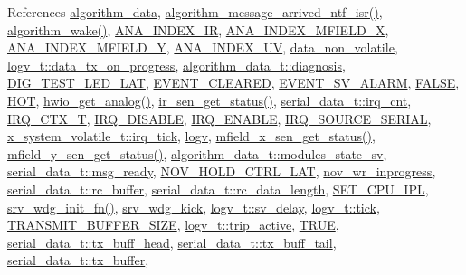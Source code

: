 References \hyperlink{a00038_source_l00033}{algorithm\+\_\+data}, \hyperlink{a00038_source_l02104}{algorithm\+\_\+message\+\_\+arrived\+\_\+ntf\+\_\+isr()}, \hyperlink{a00038_source_l00670}{algorithm\+\_\+wake()}, \hyperlink{a00058_source_l00026}{A\+N\+A\+\_\+\+I\+N\+D\+E\+X\+\_\+\+I\+R}, \hyperlink{a00058_source_l00027}{A\+N\+A\+\_\+\+I\+N\+D\+E\+X\+\_\+\+M\+F\+I\+E\+L\+D\+\_\+\+X}, \hyperlink{a00058_source_l00028}{A\+N\+A\+\_\+\+I\+N\+D\+E\+X\+\_\+\+M\+F\+I\+E\+L\+D\+\_\+\+Y}, \hyperlink{a00058_source_l00025}{A\+N\+A\+\_\+\+I\+N\+D\+E\+X\+\_\+\+U\+V}, \hyperlink{a00060_source_l00016}{data\+\_\+non\+\_\+volatile}, \hyperlink{a00021_a6cdefde69642ef511e3252c38be68516}{logv\+\_\+t\+::data\+\_\+tx\+\_\+on\+\_\+progress}, \hyperlink{a00016_a16f85d57ec98b4ad05f5a2e10536b3c6}{algorithm\+\_\+data\+\_\+t\+::diagnosis}, \hyperlink{a00058_source_l00051}{D\+I\+G\+\_\+\+T\+E\+S\+T\+\_\+\+L\+E\+D\+\_\+\+L\+A\+T}, \hyperlink{a00021_source_l00073}{E\+V\+E\+N\+T\+\_\+\+C\+L\+E\+A\+R\+E\+D}, \hyperlink{a00021_source_l00069}{E\+V\+E\+N\+T\+\_\+\+S\+V\+\_\+\+A\+L\+A\+R\+M}, \hyperlink{a00040_source_l00086}{F\+A\+L\+S\+E}, \hyperlink{a00021_source_l00153}{H\+O\+T}, \hyperlink{a00056_source_l00223}{hwio\+\_\+get\+\_\+analog()}, \hyperlink{a00045_source_l00302}{ir\+\_\+sen\+\_\+get\+\_\+status()}, \hyperlink{a00030_source_l00054}{serial\+\_\+data\+\_\+t\+::irq\+\_\+cnt}, \hyperlink{a00033_source_l00017}{I\+R\+Q\+\_\+\+C\+T\+X\+\_\+\+T}, \hyperlink{a00033_source_l00020}{I\+R\+Q\+\_\+\+D\+I\+S\+A\+B\+L\+E}, \hyperlink{a00033_source_l00025}{I\+R\+Q\+\_\+\+E\+N\+A\+B\+L\+E}, \hyperlink{a00021_source_l00058}{I\+R\+Q\+\_\+\+S\+O\+U\+R\+C\+E\+\_\+\+S\+E\+R\+I\+A\+L}, \hyperlink{a00037_source_l00098}{x\+\_\+system\+\_\+volatile\+\_\+t\+::irq\+\_\+tick}, \hyperlink{a00038_source_l00036}{logv}, \hyperlink{a00050_source_l00276}{mfield\+\_\+x\+\_\+sen\+\_\+get\+\_\+status()}, \hyperlink{a00019_ac7134882964fedc18be6c75547987a2c}{mfield\+\_\+y\+\_\+sen\+\_\+get\+\_\+status()}, \hyperlink{a00016_a293140e240bbd54f7601adbc9194148c}{algorithm\+\_\+data\+\_\+t\+::modules\+\_\+state\+\_\+sv}, \hyperlink{a00030_source_l00035}{serial\+\_\+data\+\_\+t\+::msg\+\_\+ready}, \hyperlink{a00013_source_l00122}{N\+O\+V\+\_\+\+H\+O\+L\+D\+\_\+\+C\+T\+R\+L\+\_\+\+L\+A\+T}, \hyperlink{a00060_source_l00019}{nov\+\_\+wr\+\_\+inprogress}, \hyperlink{a00030_source_l00031}{serial\+\_\+data\+\_\+t\+::rc\+\_\+buffer}, \hyperlink{a00030_source_l00033}{serial\+\_\+data\+\_\+t\+::rc\+\_\+data\+\_\+length}, \hyperlink{a00015_source_l08162}{S\+E\+T\+\_\+\+C\+P\+U\+\_\+\+I\+P\+L}, \hyperlink{a00066_source_l00096}{srv\+\_\+wdg\+\_\+init\+\_\+fn()}, \hyperlink{a00067_source_l00028}{srv\+\_\+wdg\+\_\+kick}, \hyperlink{a00021_a854b8f967c206a5f3e4aeaf91a782b3e}{logv\+\_\+t\+::sv\+\_\+delay}, \hyperlink{a00021_source_l00247}{logv\+\_\+t\+::tick}, \hyperlink{a00031_source_l00024}{T\+R\+A\+N\+S\+M\+I\+T\+\_\+\+B\+U\+F\+F\+E\+R\+\_\+\+S\+I\+Z\+E}, \hyperlink{a00021_source_l00248}{logv\+\_\+t\+::trip\+\_\+active}, \hyperlink{a00040_source_l00084}{T\+R\+U\+E}, \hyperlink{a00030_source_l00044}{serial\+\_\+data\+\_\+t\+::tx\+\_\+buff\+\_\+head}, \hyperlink{a00030_source_l00046}{serial\+\_\+data\+\_\+t\+::tx\+\_\+buff\+\_\+tail}, \hyperlink{a00030_source_l00042}{serial\+\_\+data\+\_\+t\+::tx\+\_\+buffer}, 
